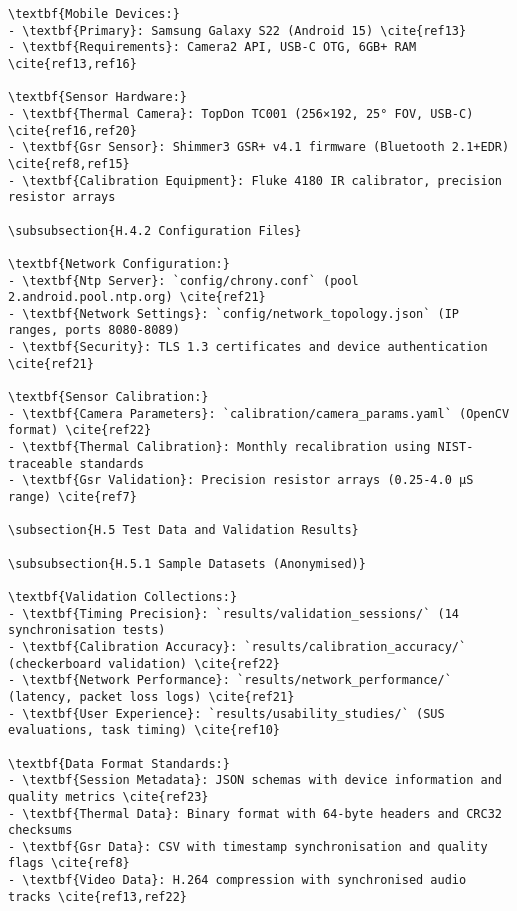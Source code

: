 \begin{verbatim}
\textbf{Mobile Devices:}
- \textbf{Primary}: Samsung Galaxy S22 (Android 15) \cite{ref13}
- \textbf{Requirements}: Camera2 API, USB-C OTG, 6GB+ RAM \cite{ref13,ref16}

\textbf{Sensor Hardware:}
- \textbf{Thermal Camera}: TopDon TC001 (256×192, 25° FOV, USB-C) \cite{ref16,ref20}
- \textbf{Gsr Sensor}: Shimmer3 GSR+ v4.1 firmware (Bluetooth 2.1+EDR) \cite{ref8,ref15}
- \textbf{Calibration Equipment}: Fluke 4180 IR calibrator, precision resistor arrays

\subsubsection{H.4.2 Configuration Files}

\textbf{Network Configuration:}
- \textbf{Ntp Server}: `config/chrony.conf` (pool 2.android.pool.ntp.org) \cite{ref21}
- \textbf{Network Settings}: `config/network_topology.json` (IP ranges, ports 8080-8089)
- \textbf{Security}: TLS 1.3 certificates and device authentication \cite{ref21}

\textbf{Sensor Calibration:}
- \textbf{Camera Parameters}: `calibration/camera_params.yaml` (OpenCV format) \cite{ref22}
- \textbf{Thermal Calibration}: Monthly recalibration using NIST-traceable standards
- \textbf{Gsr Validation}: Precision resistor arrays (0.25-4.0 μS range) \cite{ref7}

\subsection{H.5 Test Data and Validation Results}

\subsubsection{H.5.1 Sample Datasets (Anonymised)}

\textbf{Validation Collections:}
- \textbf{Timing Precision}: `results/validation_sessions/` (14 synchronisation tests)
- \textbf{Calibration Accuracy}: `results/calibration_accuracy/` (checkerboard validation) \cite{ref22}
- \textbf{Network Performance}: `results/network_performance/` (latency, packet loss logs) \cite{ref21}
- \textbf{User Experience}: `results/usability_studies/` (SUS evaluations, task timing) \cite{ref10}

\textbf{Data Format Standards:}
- \textbf{Session Metadata}: JSON schemas with device information and quality metrics \cite{ref23}
- \textbf{Thermal Data}: Binary format with 64-byte headers and CRC32 checksums
- \textbf{Gsr Data}: CSV with timestamp synchronisation and quality flags \cite{ref8}
- \textbf{Video Data}: H.264 compression with synchronised audio tracks \cite{ref13,ref22}


\end{verbatim}
